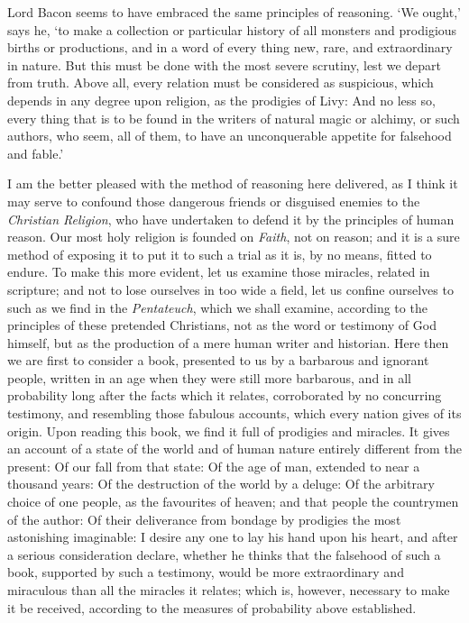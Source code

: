 \documentclass[]{article}
\newcounter{authornote}[page]
\newcommand*{\authornote}[1]{\renewcommand{\thefootnote}{\fnsymbol{footnote}}\stepcounter{authornote}\footnote[\value{authornote}]{#1}\renewcommand{\thefootnote}{\arabic{footnote}}}
\begin{document}
\begin{sectionbody}
\humeparagraph  Lord Bacon seems to have embraced the same principles of reasoning. `We ought,' says he, `to make a collection or particular history of all monsters and prodigious births or productions, and in a word of every thing new, rare, and extraordinary in nature. But this must be done with the most severe scrutiny, lest we depart from truth. Above all, every relation must be considered as suspicious, which depends in any degree upon religion, as the prodigies of Livy: And no less so, every thing that is to be found in the writers of natural magic or alchimy, or such authors, who seem, all of them, to have an unconquerable appetite for falsehood and fable.'%

\humeparagraph  I am the better pleased with the method of reasoning here delivered, as I think it may serve to confound those dangerous friends or disguised enemies to the \emph{Christian Religion}, who have undertaken to defend it by the principles of human reason. Our most holy religion is founded on \emph{Faith}, not on reason; and it is a sure method of exposing it to put it to such a trial as it is, by no means, fitted to endure. To make this more evident, let us examine those miracles, related in scripture; and not to lose ourselves in too wide a field, let us confine ourselves to such as we find in the \emph{Pentateuch}, which we shall examine, according to the principles of these pretended Christians, not as the word or testimony of God himself, but as the production of a mere human writer and historian. Here then we are first to consider a book, presented to us by a barbarous and ignorant people, written in an age when they were still more barbarous, and in all probability long after the facts which it relates, corroborated by no concurring testimony, and resembling those fabulous accounts, which every nation gives of its origin. Upon reading this book, we find it full of prodigies and miracles. It gives an account of a state of the world and of human nature entirely different from the present: Of our fall from that state: Of the age of man, extended to near a thousand years: Of the destruction of the world by a deluge: Of the arbitrary choice of one people, as the favourites of heaven; and that people the countrymen of the author: Of their deliverance from bondage by prodigies the most astonishing imaginable: I desire any one to lay his hand upon his heart, and after a serious consideration declare, whether he thinks that the falsehood of such a book, supported by such a testimony, would be more extraordinary and miraculous than all the miracles it relates; which is, however, necessary to make it be received, according to the measures of probability above established.


\end{sectionbody}
\end{document}
